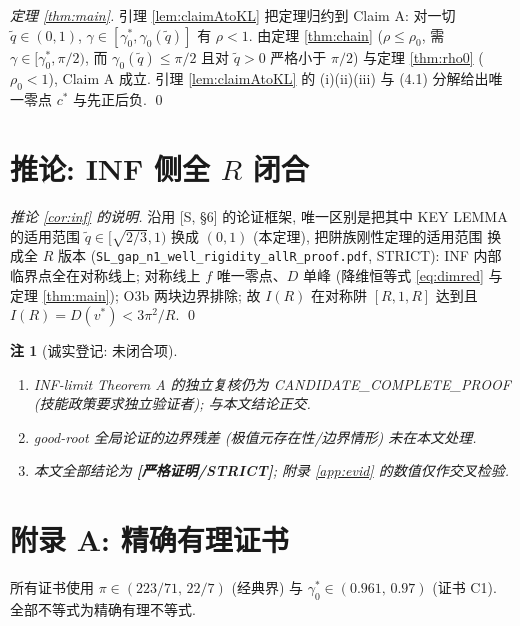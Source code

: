 \documentclass[UTF8]{ctexart}
\newtheorem{remark}[theorem]{注}
\newcommand{\STRICT}{\textbf{[严格证明/STRICT]}}
\begin{document}
\begin{proof}[定理 \ref{thm:main}]
引理 \ref{lem:claimAtoKL} 把定理归约到 Claim A: 对一切 $\tilde q\in(0,1)$,
$\gamma\in[\gamma_0^*,\gamma_0(\tilde q)]$ 有 $\rho<1$. 由定理
\ref{thm:chain} ($\rho\le\rho_0$, 需 $\gamma\in[\gamma_0^*,\pi/2)$, 而
$\gamma_0(\tilde q)\le\pi/2$ 且对 $\tilde q>0$ 严格小于 $\pi/2$) 与定理
\ref{thm:rho0} ($\rho_0<1$), Claim A 成立. 引理 \ref{lem:claimAtoKL} 的
(i)(ii)(iii) 与 (4.1) 分解给出唯一零点 $c^*$ 与先正后负. \qed
\end{proof}

\section{\texorpdfstring{推论: INF 侧全 $R$ 闭合}{推论: INF 侧全 R 闭合}}\label{sec:cor}

\begin{proof}[推论 \ref{cor:inf} 的说明]
沿用 [S, \S6] 的论证框架, 唯一区别是把其中 KEY LEMMA 的适用范围
$\tilde q\in[\sqrt{2/3},1)$ 换成 $(0,1)$ (本定理), 把阱族刚性定理的适用范围
换成全 $R$ 版本 (\texttt{SL\_gap\_n1\_well\_\allowbreak rigidity\_allR\_proof.pdf},
STRICT): INF 内部临界点全在对称线上; 对称线上 $f$ 唯一零点、$D$ 单峰
(降维恒等式 \eqref{eq:dimred} 与定理 \ref{thm:main}); O3b 两块边界排除;
故 $I(R)$ 在对称阱 $[R,1,R]$ 达到且 $I(R)=D(v^*)<3\pi^2/R$. \qed
\end{proof}

\begin{remark}[诚实登记: 未闭合项]
\begin{enumerate}
	\item[(c)] INF-limit Theorem A 的独立复核仍为 CANDIDATE\_\allowbreak COMPLETE\_\allowbreak PROOF
		(技能政策要求独立验证者); 与本文结论正交.
	\item[(d)] good-root 全局论证的边界残差 (极值元存在性/边界情形) 未在本文处理.
	\item 本文全部结论为 \STRICT{}; 附录 \ref{app:evid} 的数值仅作交叉检验.
\end{enumerate}
\end{remark}

\section{附录 A: 精确有理证书}\label{app:cert}

所有证书使用 $\pi\in(223/71,\,22/7)$ (经典界) 与
$\gamma_0^*\in(0.961,\,0.97)$ (证书 C1). 全部不等式为精确有理不等式.
\end{document}
